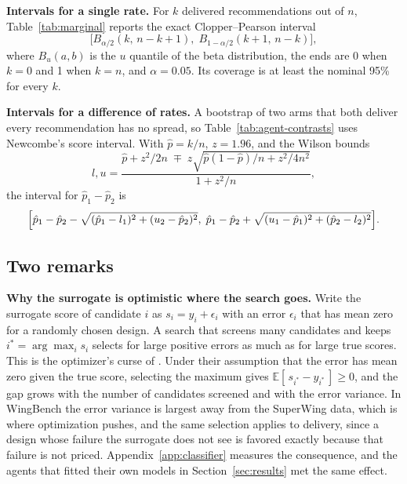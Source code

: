 \textbf{Intervals for a single rate.} For $k$ delivered recommendations out of
$n$, Table~\ref{tab:marginal} reports the exact Clopper--Pearson interval
\begin{equation}
\bigl[ B_{\alpha/2}(k,\, n - k + 1),\; B_{1 - \alpha/2}(k + 1,\, n - k) \bigr],
\label{eq:clopper}
\end{equation}
where $B_{u}(a, b)$ is the $u$ quantile of the beta distribution, the ends
are 0 when $k = 0$ and 1 when $k = n$, and $\alpha = 0.05$. Its coverage is at
least the nominal 95\% for every $k$.

\textbf{Intervals for a difference of rates.} A bootstrap of two arms that both
deliver every recommendation has no spread, so Table~\ref{tab:agent-contrasts}
uses Newcombe's score interval. With $\hat{p} = k / n$, $z = 1.96$, and the
Wilson bounds
\begin{equation}
l, u = \frac{\hat{p} + z^{2}/2n \;\mp\; z \sqrt{\hat{p}(1 - \hat{p})/n + z^{2}/4n^{2}}}
{1 + z^{2}/n},
\label{eq:wilson}
\end{equation}
the interval for $\hat{p}_1 - \hat{p}_2$ is
\begin{equation}
\Bigl[ \hat{p}_1 - \hat{p}_2 - \sqrt{(\hat{p}_1 - l_1)^{2} + (u_2 - \hat{p}_2)^{2}},\;
\hat{p}_1 - \hat{p}_2 + \sqrt{(u_1 - \hat{p}_1)^{2} + (\hat{p}_2 - l_2)^{2}} \Bigr].
\label{eq:newcombe}
\end{equation}

\subsection{Two remarks}

\textbf{Why the surrogate is optimistic where the search goes.} Write the
surrogate score of candidate $i$ as $s_i = y_i + \epsilon_i$ with an error
$\epsilon_i$ that has mean zero for a randomly chosen design. A search that
screens many candidates and keeps $i^{*} = \arg\max_i s_i$ selects for large
positive errors as much as for large true scores. This is the optimizer's
curse of \citet{smith2006curse}. Under their assumption that the error has mean
zero given the true score, selecting the maximum gives
$\mathbb{E}[\, s_{i^{*}} - y_{i^{*}} \,] \ge 0$, and the gap grows with the
number of candidates screened and with the error variance. In WingBench the error variance is
largest away from the SuperWing data, which is where optimization pushes, and
the same selection applies to delivery, since a design whose failure the
surrogate does not see is favored exactly because that failure is not priced.
Appendix~\ref{app:classifier} measures the consequence, and the agents that
fitted their own models in Section~\ref{sec:results} met the same effect.

